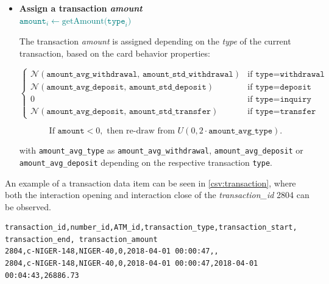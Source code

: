 \begin{enumerate}
\begin{itemize}
        \item \textbf{Assign a transaction \emph{amount}}\\
        {\footnotesize \textcolor{teal}{$\texttt{amount}_{i} \gets  \text{getAmount(}\texttt{type}_{i}\text{)}$}}
          
        The transaction \emph{amount} is assigned depending on the \emph{type} of the current transaction, based on the card behavior properties:
            
          $$
          \begin{cases}
            \mathcal{N}(\texttt{amount\_avg\_withdrawal},\, \texttt{amount\_std\_withdrawal}) & \text{if } \texttt{type} = \texttt{withdrawal} \\[10pt]
            
            \mathcal{N}(\texttt{amount\_avg\_deposit},\, \texttt{amount\_std\_deposit}) & \text{if } \texttt{type} = \texttt{deposit} \\[10pt]
        
            0 & \text{if } \texttt{type} = \texttt{inquiry} \\[10pt]
            
            \mathcal{N}(\texttt{amount\_avg\_deposit},\, \texttt{amount\_std\_transfer}) & \text{if } \texttt{type} = \texttt{transfer}
          \end{cases}
          $$
        
          $$
          \text{If } \texttt{amount} < 0, \text{ then re-draw from } U(0, 2 \cdot \texttt{amount\_avg\_type}).
          $$
        
          with \texttt{amount\_avg\_type} as \texttt{amount\_avg\_withdrawal}, \texttt{amount\_avg\_deposit} or \texttt{amount\_avg\_deposit} depending on the respective transaction \texttt{type}.   
    \end{itemize}
\end{enumerate}

An example of a transaction data item can be seen in \ref{csv:transaction}, where both the 
interaction opening and interaction close of the \emph{transaction\_id} 2804 can be observed.
\begin{center}
\lstset{style=csvStyle}
\begin{lstlisting}[caption={Example of transaction-all.csv}, label={csv:transaction}]
transaction_id,number_id,ATM_id,transaction_type,transaction_start,
transaction_end, transaction_amount
2804,c-NIGER-148,NIGER-40,0,2018-04-01 00:00:47,,
2804,c-NIGER-148,NIGER-40,0,2018-04-01 00:00:47,2018-04-01 00:04:43,26886.73
\end{lstlisting}
\end{center}

